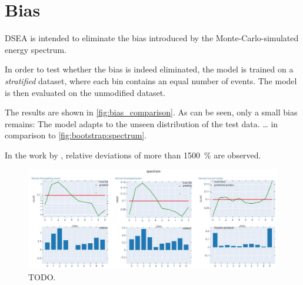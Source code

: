 \section{Bias}
DSEA is intended to eliminate the bias introduced by the Monte-Carlo-simulated energy spectrum.

In order to test
whether the bias is indeed eliminated,
the model is trained on a \emph{stratified} dataset,
where each bin contains an equal number of events.
The model is then evaluated on the unmodified dataset.

The results are shown in \autoref{fig:bias_comparison}.
As can be seen,
only a small bias remains:
The model adapts to the unseen distribution of the test data.
… in comparison to \autoref{fig:bootstrap:spectrum}.

In the work by \citeauthor{dsea_samuel},
relative deviations of more than \SI{1500}{\percent} are observed.


\begin{figure}
    \centering
    \includegraphics[width=\textwidth]{content/plots/halftime/fixweighting_spectra_comparison.jpg}
    \caption{TODO.}
    \label{fig:bias_comparison}
\end{figure}

